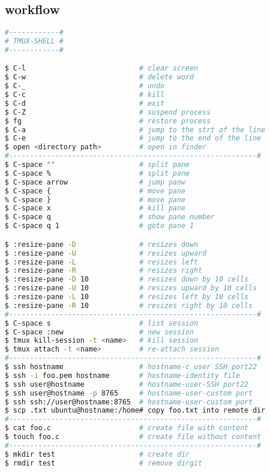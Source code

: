 \documentclass[8pt]{extarticle}
\begin{document}
\begin{small}

\newpage

\begin{multicols}{2}



\section{workflow}

\begin{lstlisting}[language=bash]
#------------#
# TMUX-SHELL #
#------------#

$ C-l							# clear screen		
$ C-w							# delete word
$ C-_							# undo
$ C-c							# kill		
$ C-d							# exit
$ C-Z							# suspend process
$ fg							# restore process
$ C-a							# jump to the strt of the line
$ C-e							# jump to the end of the line
$ open <directory path>			# open in finder
#-----------------------------------------------------------#
$ C-space ""					# split pane
$ C-space %						# split pane
$ C-space arrow					# jump panw
$ C-space {						# move pane
% C-space }						# move pane
$ C-space x						# kill pane
$ C-space q						# show pane number
$ C-space q 1					# goto pane 1

$ :resize-pane -D 				# resizes down 
$ :resize-pane -U 				# resizes upward 
$ :resize-pane -L 				# resizes left 
$ :resize-pane -R 				# resizes right 
$ :resize-pane -D 10 			# resizes down by 10 cells
$ :resize-pane -U 10 			# resizes upward by 10 cells
$ :resize-pane -L 10 			# resizes left by 10 cells
$ :resize-pane -R 10 			# resizes right by 10 cells
#-----------------------------------------------------------#
$ C-space s						# list session
$ C-space :new					# new session
$ tmux kill-session -t <name>	# kill session
$ tmux attach -t <name>			# re-attach session
#-----------------------------------------------------------#
$ ssh hostname 					# hostname-c_user SSH port22
$ ssh -i foo.pem hostname      	# hostname-identity file
$ ssh user@hostname            	# hostname-user-SSH port22
$ ssh user@hostname -p 8765   	# hostname-user-custom port
$ ssh ssh://user@hostname:8765 	# hostname-user-custom port
$ scp .txt ubuntu@hostname:/home# copy foo.txt into remote dir
#-----------------------------------------------------------#
$ cat foo.c						# create file with content	
$ touch foo.c					# create file without content
#-----------------------------------------------------------#
$ mkdir test					# create dir
$ rmdir test					# remove dirgit 


\end{lstlisting}
\end{multicols}
\end{small}
\end{document}
